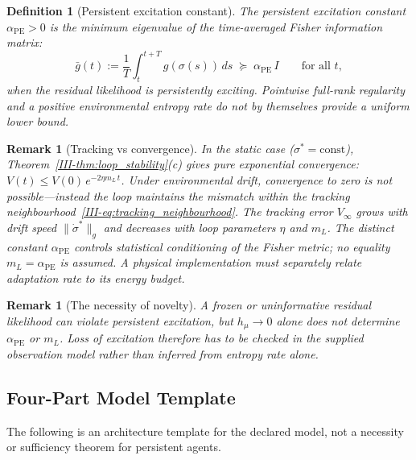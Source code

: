 \documentclass[12pt,a4paper,openany]{book}
\newtheorem{definition}[theorem]{Definition}
\newtheorem{remark}[theorem]{Remark}
\begin{document}
\begin{definition}[Persistent excitation constant]
\label{III-def:PE_constant}
The \emph{persistent excitation constant} $\alpha_{\mathrm{PE}}>0$ is
the minimum eigenvalue of the time-averaged Fisher
information matrix:
\begin{equation}
\label{III-eq:PE_constant}
\bar{g}(t)
:= \frac{1}{T}\int_t^{t+T}
g(\sigma(s))\,ds
\;\succeq\; \alpha_{\mathrm{PE}}\,I
\qquad\text{for all } t,
\end{equation}
when the residual likelihood is persistently exciting.  Pointwise
full-rank regularity and a positive environmental entropy rate do not
by themselves provide a uniform lower bound.
\end{definition}

\begin{remark}[Tracking vs convergence]
\label{III-rem:tracking}
In the static case ($\sigma^* = \mathrm{const}$),
Theorem~\ref{III-thm:loop_stability}(c) gives pure exponential
convergence:
$V(t) \leq V(0)\,e^{-2\eta m_L\,t}$.
Under environmental drift, convergence to zero is
\emph{not} possible---instead the loop maintains the
mismatch within the tracking
neighbourhood~\eqref{III-eq:tracking_neighbourhood}.
The tracking error $V_\infty$ grows with drift speed
$\|\dot{\sigma}^*\|_g$ and decreases with loop parameters
$\eta$ and $m_L$.  The distinct constant
$\alpha_{\mathrm{PE}}$ controls statistical conditioning of the Fisher
metric; no equality $m_L=\alpha_{\mathrm{PE}}$ is assumed.  A physical
implementation must separately relate adaptation rate to its energy
budget.
\end{remark}

\begin{remark}[The necessity of novelty]
\label{III-rem:novelty}
A frozen or uninformative residual likelihood can violate persistent
excitation, but $h_\mu\to0$ alone does not determine
$\alpha_{\mathrm{PE}}$ or $m_L$.  Loss of excitation therefore has to
be checked in the supplied observation model rather than inferred from
entropy rate alone.
\end{remark}

\subsection{Four-Part Model Template}
\label{III-subsec:four_part}

The following is an architecture template for the declared model, not a
necessity or sufficiency theorem for persistent agents.
\end{document}

